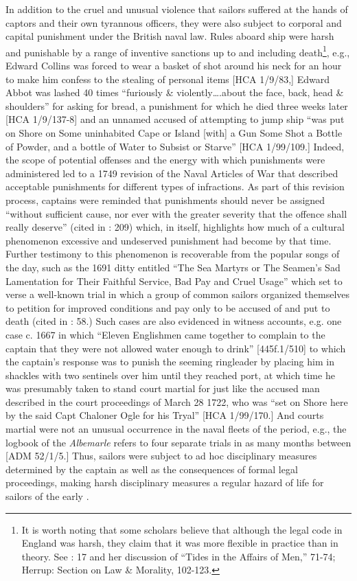   In addition to the cruel and unusual violence that sailors suffered at the hands of captors and their own tyrannous officers, they were also subject to corporal and capital punishment under the British naval law. Rules aboard ship were harsh and punishable by a range of inventive sanctions up to and including death\footnote{It is worth noting that some scholars believe that although the legal code in England was harsh, they claim that it was more flexible in practice than in theory. See \citealt{Fury2015}: 17 and her discussion of “Tides in the Affairs of Men,” 71-74; Herrup: Section on Law \& Morality, 102-123.}, e.g., Edward Collins was forced to wear a basket of shot around his neck for an hour to make him confess to the stealing of personal items [HCA 1/9/83,] Edward Abbot was lashed 40 times “furiously \& violently….about the face, back, head \& shoulders” for asking for bread, a punishment for which he died three weeks later [HCA 1/9/137-8] and an unnamed  accused of attempting to jump ship “was put on Shore on Some uninhabited Cape or Island [with] a Gun Some Shot a Bottle of Powder, and a bottle of Water to Subsist or Starve” [HCA 1/99/109.] Indeed, the scope of potential offenses and the energy with which punishments were administered led to a 1749 revision of the Naval Articles of War that described acceptable punishments for different types of infractions. As part of this revision process, captains were reminded that punishments should never be assigned “without sufficient cause, nor ever with the greater severity that the offence shall really deserve” (cited in \citealt{AdkinsAdkins2008}: 209) which, in itself, highlights how much of a cultural phenomenon excessive and undeserved punishment had become by that time. Further testimony to this phenomenon is recoverable from the popular songs of the day, such as the 1691 ditty entitled “The Sea Martyrs or The Seamen’s Sad Lamentation for Their Faithful Service, Bad Pay and Cruel Usage” which set to verse a well-known trial in which a group of common sailors organized themselves to petition for improved conditions and pay only to be accused of  and put to death (cited in \citealt{Palmer1986}: 58.) Such cases are also evidenced in witness accounts, e.g. one case c. 1667 in which “Eleven Englishmen came together to complain to the captain that they were not allowed water enough to drink” [445f.1/510] to which the captain’s response was to punish the seeming ringleader by placing him in shackles with two sentinels over him until they reached port, at which time he was presumably taken to stand court martial for  just like the accused man described in the court proceedings of March 28 1722, who was “set on Shore here by the said Capt Chaloner Ogle for his Tryal” [HCA 1/99/170.] And courts martial were not an unusual occurrence in the naval fleets of the period, e.g., the logbook of the \textit{Albemarle} refers to four separate trials in as many months between \citealt{JanuaryApril1697} [ADM 52/1/5.] Thus, sailors were subject to ad hoc disciplinary measures determined by the captain as well as the consequences of formal legal proceedings, making harsh disciplinary measures a regular hazard of life for sailors of the early .

